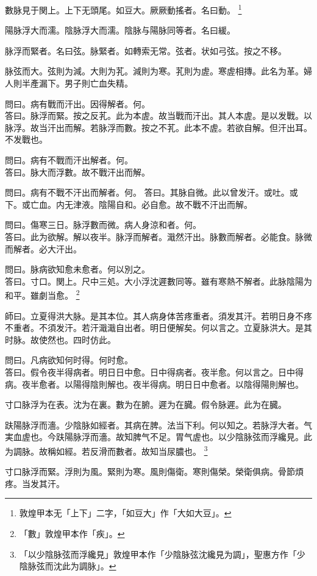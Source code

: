 數脉見于関上。{\khaaitp 上下}无頭尾。如豆大。厥厥動搖者。名曰動。
	\footnote{敦煌甲本无「上下」二字，「如豆大」作「大如大豆」。}

陽脉浮大而濡。陰脉浮大而濡。陰脉与陽脉同等者。名曰緩。

脉浮而緊者。名曰弦。脉緊者。如轉索无常。弦者。状如弓弦。按之不移。

脉弦而大。弦則为減。大則为芤。減則为寒。芤則为虗。寒虗相摶。此名为革。婦人則半產漏下。男子則亡血失精。

問曰。病有戰而汗出。因得解者。何。\\
答曰。脉浮而緊。按之反芤。此为本虗。故当戰而汗出。其人本虗。是以发戰。以脉浮。故当汗出而解。若脉浮而數。按之不芤。此本不虗。若欲自解。但汗出耳。不发戰也。

問曰。病有不戰而汗出解者。何。\\
答曰。脉大而浮數。故不戰汗出而解。

問曰。病有不戰不汗出而解者。何。
答曰。其脉自微。此以曾发汗。或吐。或下。或亡血。内无津液。陰陽自和。必自愈。故不戰不汗出而解。

問曰。傷寒三日。脉浮數而微。病人身涼和者。何。\\
答曰。此为欲解。解以夜半。脉浮而解者。濈然汗出。脉數而解者。必能食。脉微而解者。必大汗出。

問曰。脉病欲知愈未愈者。何以別之。\\
答曰。寸口。関上。尺中三処。大小浮沈遲數同等。雖有寒熱不解者。此脉陰陽为和平。雖劇当愈。
	\footnote{「數」敦煌甲本作「疾」。}

師曰。立夏得洪大脉。是其本位。其人病身体苦疼重者。須发其汗。若明日身不疼不重者。不須发汗。若汗濈濈自出者。明日便解矣。何以言之。立夏脉洪大。是其时脉。故使然也。四时仿此。

問曰。凡病欲知何时得。何时愈。\\
答曰。假令夜半得病者。明日日中愈。日中得病者。夜半愈。何以言之。日中得病。夜半愈者。以陽得陰則解也。夜半得病。明日日中愈者。以陰得陽則解也。

寸口脉浮为在表。沈为在裏。數为在腑。遲为在臓。假令脉遲。此为在臓。

趺陽脉浮而濇。少陰脉如經者。其病在脾。法当下利。何以知之。若脉浮大者。气実血虗也。今趺陽脉浮而濇。故知脾气不足。胃气虗也。以少陰脉弦而浮纔見。此为調脉。故稱如經。若反滑而數者。故知当尿膿也。
	\footnote{「以少陰脉弦而浮纔見」敦煌甲本作「少陰脉弦沈纔見为調」，聖惠方作「少陰脉弦而沈此为調脉」。}

寸口脉浮而緊。浮則为風。緊則为寒。風則傷衛。寒則傷榮。榮衛俱病。骨節煩疼。当发其汗。

